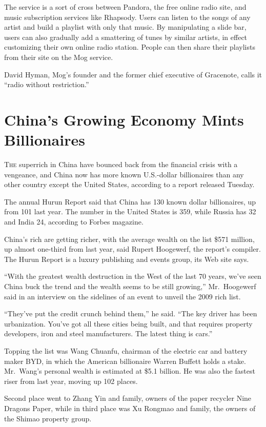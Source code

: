 ﻿\documentclass[12pt]{article}
\begin{document}
The service is a sort of cross between Pandora, the free online radio site, and music subscription
services like Rhapsody. Users can listen to the songs of any artist and build a playlist with only
that music. By manipulating a slide bar, users can also gradually add a smattering of tunes by
similar artists, in effect customizing their own online radio station. People can then share their
playlists from their site on the Mog service.

David Hyman, Mog's founder and the former chief executive of Gracenote, calls it ``radio without
restriction.''

\section{China's Growing Economy Mints Billionaires}

\lettrine{T}{he} superrich in China have bounced back from the financial
crisis with a vengeance, and China now has more known U.S.-dollar billionaires than any other
country except the United States, according to a report released Tuesday.

The annual Hurun Report said that China has 130 known dollar billionaires, up from 101 last year.
The number in the United States is 359, while Russia has 32 and India 24, according to Forbes
magazine.

China's rich are getting richer, with the average wealth on the list \$571 million, up almost
one-third from last year, said Rupert Hoogewerf, the report's compiler. The Hurun Report is a luxury
publishing and events group, its Web site says.

``With the greatest wealth destruction in the West of the last 70 years, we've seen China buck the
trend and the wealth seems to be still growing,'' Mr.~Hoogewerf said in an interview on the
sidelines of an event to unveil the 2009 rich list.

``They've put the credit crunch behind them,'' he said. ``The key driver has been urbanization.
You've got all these cities being built, and that requires property developers, iron and steel
manufacturers. The latest thing is cars.''

Topping the list was Wang Chuanfu, chairman of the electric car and battery maker BYD, in which the
American billionaire Warren Buffett holds a stake. Mr.~Wang's personal wealth is estimated at \$5.1
billion. He was also the fastest riser from last year, moving up 102 places.

Second place went to Zhang Yin and family, owners of the paper recycler Nine Dragons Paper, while in
third place was Xu Rongmao and family, the owners of the Shimao property group.
\end{document}
